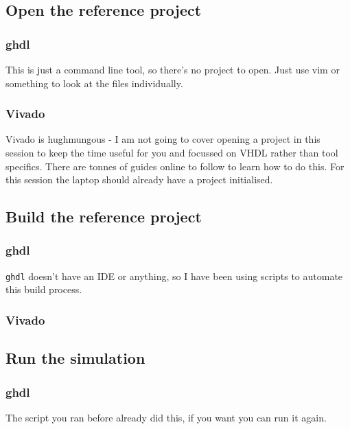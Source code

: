 \subsection{Open the reference project}
\subsubsection{ghdl}
This is just a command line tool, so there's no project to open. Just use vim or something to look at the files individually.

\subsubsection{Vivado}
Vivado is hughmungous - I am not going to cover opening a project in this session to keep the time useful for you and focussed on VHDL rather than tool specifics. There are tonnes of guides online to follow to learn how to do this. For this session the laptop should already have a project initialised.

\subsection{Build the reference project}
\subsubsection{ghdl}
\texttt{ghdl} doesn't have an IDE or anything, so I have been using scripts to automate this build process. 


\subsubsection{Vivado}


\subsection{Run the simulation}
\subsubsection{ghdl} 
The script you ran before already did this, if you want you can run it again.

